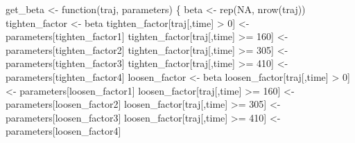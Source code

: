 \documentclass[
  11pt,
  letterpaper,
  DIV=11,
  numbers=noendperiod]{scrartcl}
\newenvironment{Shaded}{\begin{snugshade}}{\end{snugshade}}
\newcommand{\ConstantTok}[1]{\textcolor[rgb]{0.56,0.35,0.01}{#1}}
\newcommand{\ControlFlowTok}[1]{\textcolor[rgb]{0.00,0.23,0.31}{#1}}
\newcommand{\DecValTok}[1]{\textcolor[rgb]{0.68,0.00,0.00}{#1}}
\newcommand{\FunctionTok}[1]{\textcolor[rgb]{0.28,0.35,0.67}{#1}}
\newcommand{\NormalTok}[1]{\textcolor[rgb]{0.00,0.23,0.31}{#1}}
\newcommand{\OtherTok}[1]{\textcolor[rgb]{0.00,0.23,0.31}{#1}}
\newcommand{\SpecialCharTok}[1]{\textcolor[rgb]{0.37,0.37,0.37}{#1}}
\newcommand{\StringTok}[1]{\textcolor[rgb]{0.13,0.47,0.30}{#1}}
\begin{document}
\begin{Shaded}
\begin{Highlighting}[]
\NormalTok{get\_beta }\OtherTok{\textless{}{-}} \ControlFlowTok{function}\NormalTok{(traj, parameters) \{}
\NormalTok{    beta }\OtherTok{\textless{}{-}} \FunctionTok{rep}\NormalTok{(}\ConstantTok{NA}\NormalTok{, }\FunctionTok{nrow}\NormalTok{(traj))}
\NormalTok{    tighten\_factor }\OtherTok{\textless{}{-}}\NormalTok{ beta}
\NormalTok{    tighten\_factor[traj[,}\StringTok{\textquotesingle{}time\textquotesingle{}}\NormalTok{] }\SpecialCharTok{\textgreater{}} \DecValTok{0}\NormalTok{]    }\OtherTok{\textless{}{-}}\NormalTok{ parameters[}\StringTok{\textquotesingle{}tighten\_factor1\textquotesingle{}}\NormalTok{]}
\NormalTok{    tighten\_factor[traj[,}\StringTok{\textquotesingle{}time\textquotesingle{}}\NormalTok{] }\SpecialCharTok{\textgreater{}=} \DecValTok{160}\NormalTok{] }\OtherTok{\textless{}{-}}\NormalTok{ parameters[}\StringTok{\textquotesingle{}tighten\_factor2\textquotesingle{}}\NormalTok{]}
\NormalTok{    tighten\_factor[traj[,}\StringTok{\textquotesingle{}time\textquotesingle{}}\NormalTok{] }\SpecialCharTok{\textgreater{}=} \DecValTok{305}\NormalTok{] }\OtherTok{\textless{}{-}}\NormalTok{ parameters[}\StringTok{\textquotesingle{}tighten\_factor3\textquotesingle{}}\NormalTok{]}
\NormalTok{    tighten\_factor[traj[,}\StringTok{\textquotesingle{}time\textquotesingle{}}\NormalTok{] }\SpecialCharTok{\textgreater{}=} \DecValTok{410}\NormalTok{] }\OtherTok{\textless{}{-}}\NormalTok{ parameters[}\StringTok{\textquotesingle{}tighten\_factor4\textquotesingle{}}\NormalTok{]}
\NormalTok{    loosen\_factor }\OtherTok{\textless{}{-}}\NormalTok{ beta}
\NormalTok{    loosen\_factor[traj[,}\StringTok{\textquotesingle{}time\textquotesingle{}}\NormalTok{] }\SpecialCharTok{\textgreater{}} \DecValTok{0}\NormalTok{]    }\OtherTok{\textless{}{-}}\NormalTok{ parameters[}\StringTok{\textquotesingle{}loosen\_factor1\textquotesingle{}}\NormalTok{]}
\NormalTok{    loosen\_factor[traj[,}\StringTok{\textquotesingle{}time\textquotesingle{}}\NormalTok{] }\SpecialCharTok{\textgreater{}=} \DecValTok{160}\NormalTok{] }\OtherTok{\textless{}{-}}\NormalTok{ parameters[}\StringTok{\textquotesingle{}loosen\_factor2\textquotesingle{}}\NormalTok{]}
\NormalTok{    loosen\_factor[traj[,}\StringTok{\textquotesingle{}time\textquotesingle{}}\NormalTok{] }\SpecialCharTok{\textgreater{}=} \DecValTok{305}\NormalTok{] }\OtherTok{\textless{}{-}}\NormalTok{ parameters[}\StringTok{\textquotesingle{}loosen\_factor3\textquotesingle{}}\NormalTok{]}
\NormalTok{    loosen\_factor[traj[,}\StringTok{\textquotesingle{}time\textquotesingle{}}\NormalTok{] }\SpecialCharTok{\textgreater{}=} \DecValTok{410}\NormalTok{] }\OtherTok{\textless{}{-}}\NormalTok{ parameters[}\StringTok{\textquotesingle{}loosen\_factor4\textquotesingle{}}\NormalTok{]}

\end{Highlighting}
\end{Shaded}
\end{document}
